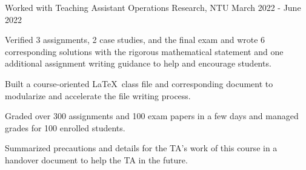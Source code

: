\begin{cventries}

    \cventry
    {Worked with }
    {Teaching Assistant} %
    {Operations Research, NTU} %
    {March 2022 - June 2022} %
    {
      \begin{cvitems} %
        \item {Verified 3 assignments, 2 case studies, and the final exam
            and wrote 6 corresponding solutions with the rigorous mathematical
            statement and one additional
            assignment writing guidance to help and encourage students.}
        \item Built a course-oriented \LaTeX\ class file and corresponding
            document to modularize and accelerate the file 
            writing process.
        \item Graded over 300 assignments and 100 exam papers in a few days
            and managed grades for 100 enrolled students.
        \item Summarized precautions and details for the TA's work of
            this course in a handover document to help the TA in the future.
      \end{cvitems}
    }





\end{cventries}
